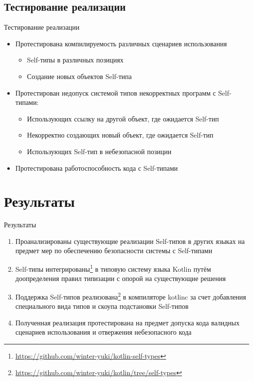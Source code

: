 \documentclass[handout,aspectratio=169,usenames,dvipsnames]{beamer}
\begin{document}
    \subsection{Тестирование реализации}

    \begin{frame}{Тестирование реализации}

        \begin{itemize}
            \item Протестирована компилируемость различных сценариев использования
            \begin{itemize}
                \item Self-типы в различных позициях
                \item Создание новых объектов Self-типа
            \end{itemize}
            \item Протестирован недопуск системой типов некорректных программ с Self-типами:
            \begin{itemize}
                \item Использующих ссылку на другой объект, где ожидается Self-тип
                \item Некорректно создающих новый объект, где ожидается Self-тип
                \item Использующих Self-тип в небезопасной позиции
            \end{itemize}
            \item Протестирована работоспособность кода с Self-типами
        \end{itemize}
    \end{frame}


    \section{Результаты}

    \begin{frame}{Результаты}

        \begin{enumerate}
            \item Проанализированы существующие реализации Self-типов в других языках на предмет мер по обеспечению безопасности системы с Self-типами
            \item Self-типы интегрированы\footnote{\url{https://github.com/winter-yuki/kotlin-self-types}} в типовую систему языка Kotlin путём доопределения правил типизации с опорой на существующие решения
            \item Поддержка Self-типов реализована\footnote{\url{https://github.com/winter-yuki/kotlin/tree/self-types}} в компиляторе kotlinc за счет добавления специального вида типов и скоупа подстановки Self-типов
            \item Полученная реализация протестирована на предмет допуска кода валидных сценариев использования и отвержения небезопасного кода
        \end{enumerate}
    \end{frame}
\end{document}
